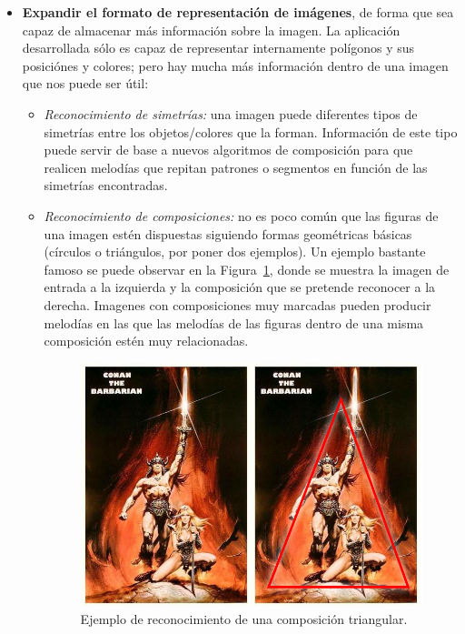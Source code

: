 \begin{itemize}
\item\textbf{Expandir el formato de representación de imágenes}, de forma que sea capaz de almacenar más información sobre la imagen. La aplicación desarrollada sólo es capaz de representar internamente polígonos y sus posiciónes y colores; pero hay mucha más información dentro de una imagen que nos puede ser útil:

	\begin{itemize}
	
		\item\textit{Reconocimiento de simetrías:} una imagen puede diferentes tipos de simetrías entre los objetos/colores que la forman. Información de este tipo puede servir de base a nuevos algoritmos de composición para que realicen melodías que repitan patrones o segmentos en función de las simetrías encontradas.
		
		\item\textit{Reconocimiento de composiciones:} no es poco común que las figuras de una imagen estén dispuestas siguiendo formas geométricas básicas (círculos o triángulos, por poner dos ejemplos). Un ejemplo bastante famoso se puede observar en la Figura~\ref{fig:composition}, donde se muestra la imagen de entrada a la izquierda y la composición que se pretende reconocer a la derecha. Imagenes con composiciones muy marcadas pueden producir melodías en las que las melodías de las figuras dentro de una misma composición estén muy relacionadas.\\
			
			\begin{figure}[!htbp]
			\centering
			\includegraphics[scale=0.47]{graphics/composition2.png}
			\caption{Ejemplo de reconocimiento de una composición triangular.}
			\label{fig:composition}
			\end{figure}
		

\end{itemize}
\end{itemize}
